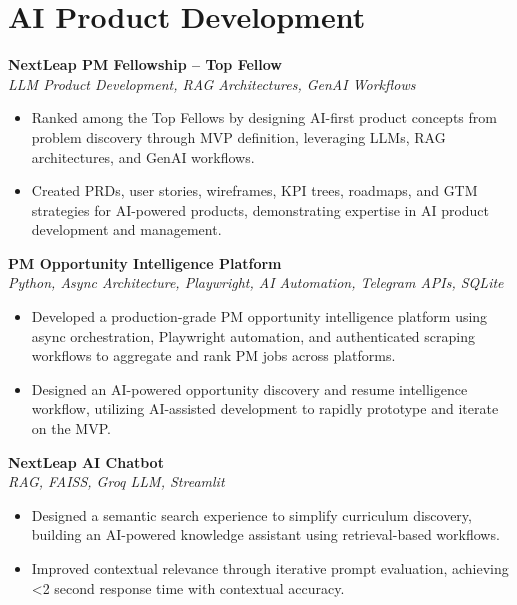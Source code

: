 \documentclass[10pt,a4paper]{article}
\begin{document}

\section{AI Product Development}
\textbf{NextLeap PM Fellowship -- Top Fellow} \\
\textit{LLM Product Development, RAG Architectures, GenAI Workflows}
\begin{itemize}
    \item Ranked among the Top Fellows by designing AI-first product concepts from problem discovery through MVP definition, leveraging LLMs, RAG architectures, and GenAI workflows.
    \item Created PRDs, user stories, wireframes, KPI trees, roadmaps, and GTM strategies for AI-powered products, demonstrating expertise in AI product development and management.
\end{itemize}
\vspace{1pt}

\textbf{PM Opportunity Intelligence Platform} \\
\textit{Python, Async Architecture, Playwright, AI Automation, Telegram APIs, SQLite}
\begin{itemize}
    \item Developed a production-grade PM opportunity intelligence platform using async orchestration, Playwright automation, and authenticated scraping workflows to aggregate and rank PM jobs across platforms.
    \item Designed an AI-powered opportunity discovery and resume intelligence workflow, utilizing AI-assisted development to rapidly prototype and iterate on the MVP.
\end{itemize}
\vspace{1pt}

\textbf{NextLeap AI Chatbot} \\
\textit{RAG, FAISS, Groq LLM, Streamlit}
\begin{itemize}
    \item Designed a semantic search experience to simplify curriculum discovery, building an AI-powered knowledge assistant using retrieval-based workflows.
    \item Improved contextual relevance through iterative prompt evaluation, achieving <2 second response time with contextual accuracy.
\end{itemize}
\vspace{1pt}
\end{document}

